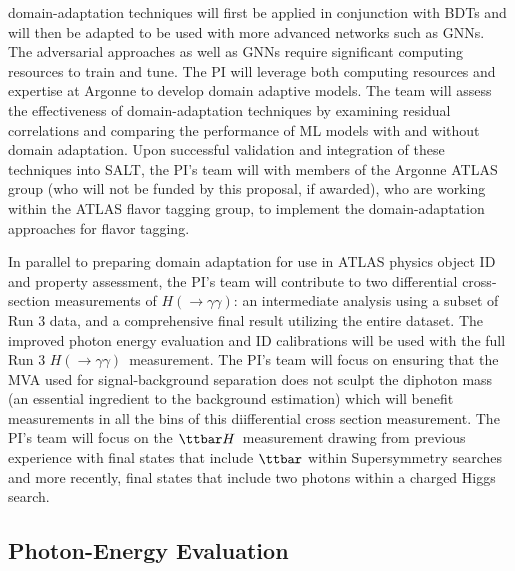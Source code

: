 \documentclass[letter, USenglish, 11pt, subfigure]{article}
\newcommand{\tth}{\ensuremath{\ttbar H}}
\newcommand{\hyy}{\ensuremath{H(\to\gamma\gamma)}}
\begin{document}
domain-adaptation techniques will first be applied in conjunction with BDTs and will then be adapted to be used with more advanced networks such as GNNs. The adversarial approaches as well as GNNs require significant computing resources to train and tune. The PI will leverage both computing resources and expertise at Argonne to develop domain adaptive models.
The team will assess the effectiveness of domain-adaptation techniques by examining residual correlations and comparing the performance of ML models with and without domain adaptation. Upon successful validation and integration of these techniques into SALT, the PI's team will with members of the Argonne ATLAS group (who will not be funded by this proposal, if awarded), who are working within the ATLAS flavor tagging group, to implement the domain-adaptation approaches for flavor tagging.

In parallel to preparing domain adaptation for use in ATLAS physics object ID and property assessment, the PI's team will contribute to two differential cross-section measurements of \hyy: an intermediate analysis using a subset of Run 3 data, and a comprehensive final result utilizing the entire dataset. The improved photon energy evaluation and ID calibrations will be used with the full Run 3 \hyy\  measurement. The PI's team will focus on ensuring that the MVA used for signal-background separation does not sculpt the diphoton mass (an essential ingredient to the background estimation) which will benefit measurements in all the bins of this diifferential cross section measurement. The PI's team will focus on the \tth\ measurement drawing from previous experience with final states that include $\ttbar$ within Supersymmetry searches and more recently, final states that include two photons within a charged Higgs search. 


\subsection{Photon-Energy Evaluation}
\end{document}
